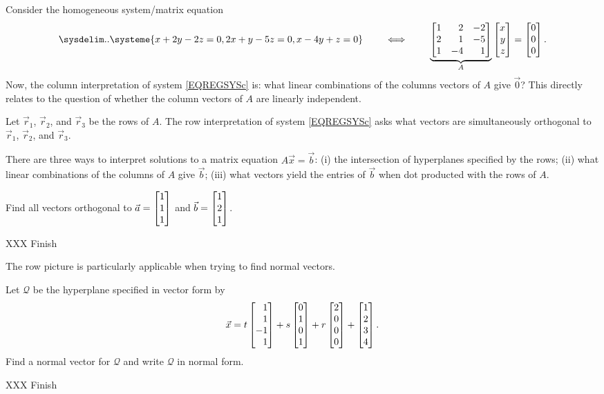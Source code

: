 Consider the homogeneous system/matrix equation
\begin{equation}
	\label{EQREGSYSc}
	\sysdelim..
		\systeme{
			x+2y-2z=0,
			2x+y-5z=0,
			x-4y+z=0
		}
		\qquad\iff\qquad
		\underbrace{\mat{1&2&-2\\2&1&-5\\1&-4&1}}_A\mat{x\\y\\z}=\mat{0\\0\\0}
		.
\end{equation}
Now, the column interpretation of system \eqref{EQREGSYSc} is: what linear combinations of the columns vectors
of $A$ give $\vec 0$? This directly relates to the question of whether the column vectors of $A$ are linearly independent.

Let $\vec r_1$, $\vec r_2$, and $\vec r_3$ be the rows of $A$. The row interpretation of system \eqref{EQREGSYSc} asks
what vectors are simultaneously orthogonal to $\vec r_1$, $\vec r_2$, and $\vec r_3$.

\begin{emphbox}[Takeaway]
	There are three ways to interpret solutions to a matrix equation $A\vec x=\vec b$: (i) the intersection of hyperplanes
	specified by the rows; (ii) what linear combinations of the columns of $A$ give $\vec b$; (iii) what vectors yield
	the entries of $\vec b$ when dot producted with the rows of $A$.
\end{emphbox}

\begin{example}
	Find all vectors orthogonal to $\vec a=\mat{1\\1\\1}$ and $\vec b=\mat{1\\2\\1}$.

	XXX Finish
\end{example}

The row picture is particularly applicable when trying to find normal vectors.

\begin{example}
	Let $\mathcal Q$ be the hyperplane specified in vector form by
	\[
		\vec x=t\mat{1\\1\\-1\\1}+s\mat{0\\1\\0\\1}+r\mat{2\\0\\0\\0}+\mat{1\\2\\3\\4}.
	\]
	Find a normal vector for $\mathcal Q$ and write $\mathcal Q$ in normal form.

	XXX Finish
\end{example}



